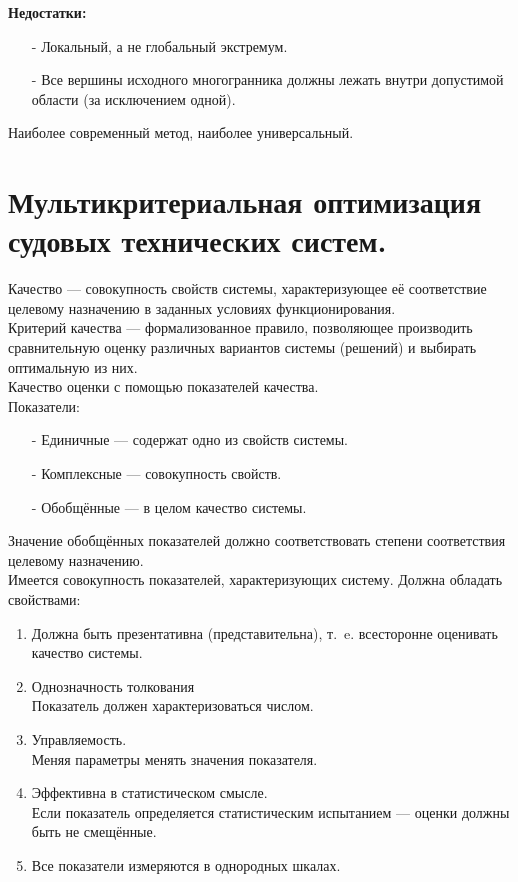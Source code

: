 \documentclass[12pt,a5paper]{scrbook}
\begin{document}
  \textbf{Недостатки:}
  \begin{itemize}
    \item[-] Локальный, а не глобальный экстремум.
    \item[-] Все вершины исходного многогранника должны лежать внутри допустимой области (за исключением одной).
  \end{itemize}
  Наиболее современный метод, наиболее универсальный.
  
  \section{Мультикритериальная оптимизация судовых технических систем.} %
  Качество --- совокупность свойств системы, характеризующее её соответствие целевому назначению в заданных условиях функционирования.\\
  
  Критерий качества --- формализованное правило, позволяющее производить сравнительную оценку различных вариантов системы (решений) и выбирать оптимальную из них.\\
  
  Качество оценки с помощью показателей качества.\\
  Показатели:
  \begin{itemize}
    \item[-] Единичные --- содержат одно из свойств системы.
    \item[-] Комплексные --- совокупность свойств.
    \item[-] Обобщённые --- в целом качество системы.
  \end{itemize}
  
  Значение обобщённых показателей должно соответствовать степени соответствия целевому назначению.\\
  
  Имеется совокупность показателей, характеризующих систему. Должна обладать свойствами:
  \begin{enumerate}
   \item Должна быть презентативна (представительна), т.~e. всесторонне оценивать качество системы.
   \item Однозначность толкования\\
     Показатель должен характеризоваться числом.
   \item Управляемость.\\
     Меняя параметры менять значения показателя.
   \item Эффективна в статистическом смысле.\\
     Если показатель определяется статистическим испытанием --- оценки должны быть не смещённые.
   \item Все показатели измеряются в однородных шкалах.
  \end{enumerate}
  
\end{document}
